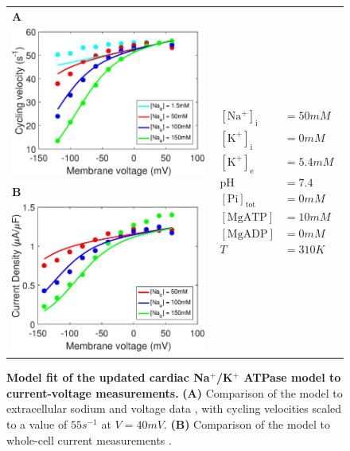 \documentclass[fleqn,10pt]{physiome}
\begin{document}
\begin{figure}
	\centering
	\begin{tabular}{l c}
		{\Large\textbf{A}} & \multirow{4}{0.4\linewidth}[0cm]{
			\begin{minipage}{\linewidth}
				\vspace{2cm}
				\begin{align*}
				\mathrm{[Na^+]_i} &= 50\si{mM} \\
				\mathrm{[K^+]_i} &= 0\si{mM} \\
				\mathrm{[K^+]_e} &= 5.4\si{mM} \\
				\mathrm{pH} &= 7.4 \\
				\mathrm{[Pi]_{tot}} &= 0\si{mM} \\
				\mathrm{[MgATP]} &= 10\si{mM} \\
				\mathrm{[MgADP]} &= 0\si{mM} \\
				T &= 310\si{K}
				\end{align*}
		\end{minipage} } \\
		\includegraphics[width=0.4\linewidth]{Terkildsen_kinetic_fit_KA_comparison.eps} &
		\\
		{\Large\textbf{B}} &   \\
		\includegraphics[width=0.4\linewidth]{Terkildsen_fit_NG_I.eps} & 
	\end{tabular}
	\caption{\textbf{Model fit of the updated cardiac Na$^+$/K$^+$ ATPase model to current-voltage measurements.} \textbf{(A)} Comparison of the model to extracellular sodium and voltage data \citep[Fig. 3]{nakao_[na]_1989}, with cycling velocities scaled to a value of $55\si{s^{-1}}$ at $V = 40\si{mV}$. \textbf{(B)} Comparison of the model to whole-cell current measurements \citep[Fig. 2(a)]{nakao_[na]_1989}.} 
	\label{fig:fitting}
\end{figure}
\end{document}
